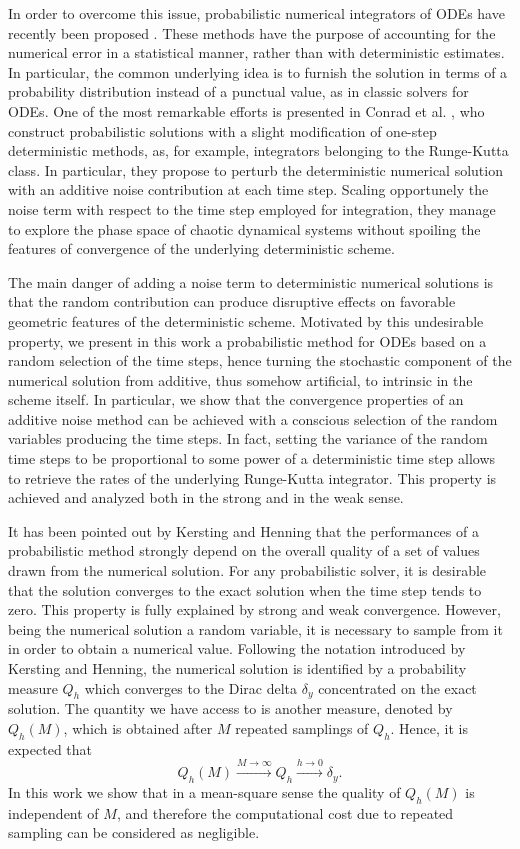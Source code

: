 \documentclass{siamart1116}
\numberwithin{theorem}{section}
\newcommand{\rightarrowtext}[1]{\ensuremath{\stackrel{#1}{\longrightarrow}}}
\begin{document}
In order to overcome this issue, probabilistic numerical integrators of ODEs have recently been proposed \cite{CGS16, KeH16}. These methods have the purpose of accounting for the numerical error in a statistical manner, rather than with deterministic estimates. In particular, the common underlying idea is to furnish the solution in terms of a probability distribution instead of a punctual value, as in classic solvers for ODEs. One of the most remarkable efforts is presented in Conrad et al. \cite{CGS16}, who construct probabilistic solutions with a slight modification of one-step deterministic methods, as, for example, integrators belonging to the Runge-Kutta class. In particular, they propose to perturb the deterministic numerical solution with an additive noise contribution at each time step. Scaling opportunely the noise term with respect to the time step employed for integration, they manage to explore the phase space of chaotic dynamical systems without spoiling the features of convergence of the underlying deterministic scheme. 

The main danger of adding a noise term to deterministic numerical solutions is that the random contribution can produce disruptive effects on favorable geometric features of the deterministic scheme. Motivated by this undesirable property, we present in this work a probabilistic method for ODEs based on a random selection of the time steps, hence turning the stochastic component of the numerical solution from additive, thus somehow artificial, to intrinsic in the scheme itself. In particular, we show that the convergence properties of an additive noise method can be achieved with a conscious selection of the random variables producing the time steps. In fact, setting the variance of the random time steps to be proportional to some power of a deterministic time step allows to retrieve the rates of the underlying Runge-Kutta integrator. This property is achieved and analyzed both in the strong and in the weak sense. 

It has been pointed out by Kersting and Henning \cite{KeH16} that the performances of a probabilistic method strongly depend on the overall quality of a set of values drawn from the numerical solution. For any probabilistic solver, it is desirable that the solution converges to the exact solution when the time step tends to zero. This property is fully explained by strong and weak convergence. However, being the numerical solution a random variable, it is necessary to sample from it in order to obtain a numerical value. Following the notation introduced by Kersting and Henning, the numerical solution is identified by a probability measure $Q_h$ which converges to the Dirac delta $\delta_y$ concentrated on the exact solution. The quantity we have access to is another measure, denoted by $Q_h(M)$, which is obtained after $M$ repeated samplings of $Q_h$. Hence, it is expected that
\begin{equation}
Q_h(M) \rightarrowtext{M\to\infty} Q_h \rightarrowtext{h\to 0} \delta_y.
\end{equation}
In this work we show that in a mean-square sense the quality of $Q_h(M)$ is independent of $M$, and therefore the computational cost due to repeated sampling can be considered as negligible. 
\end{document}
